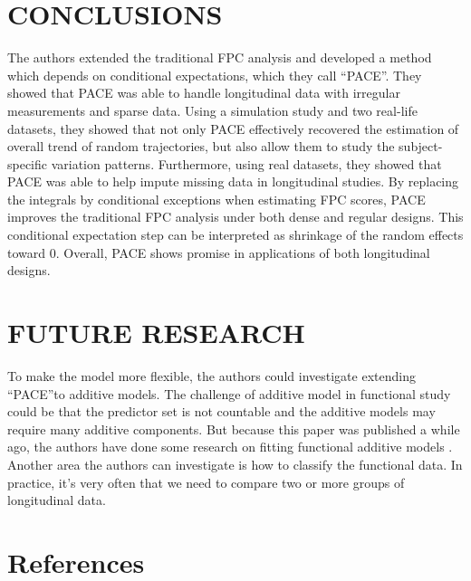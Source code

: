 \documentclass[11pt]{report}
\begin{document}
\section{CONCLUSIONS}
The authors extended the traditional FPC analysis and developed a method which depends on conditional expectations, which they call ``PACE''.
They showed that PACE was able to handle longitudinal data with irregular measurements and sparse data. 
Using a simulation study and two real-life datasets, they showed that not only PACE effectively recovered the estimation of overall trend of random trajectories, but also allow them to study the subject-specific variation patterns. 
Furthermore, using real datasets, they showed that PACE was able to help impute missing data in longitudinal studies. 
By replacing the integrals by conditional exceptions when estimating FPC scores, PACE improves the traditional FPC analysis under both dense and regular designs. 
This conditional expectation step can be interpreted as shrinkage of the random effects toward 0.  
Overall, PACE shows promise in applications of both longitudinal designs. 


\section{FUTURE RESEARCH}
To make the model more flexible, the authors could investigate extending ``PACE''to additive models. 
The challenge of additive model in functional study could be that the predictor set is not countable and the additive models may require many additive components. 
But because this paper was published a while ago, the authors have done some research on fitting functional additive models \cite{Muller2008}. 
Another area the authors can investigate is how to classify the functional data. 
In practice, it's very often that we need to compare two or more groups of longitudinal data. 


\newpage
\section*{References}
\printbibliography    
\end{document}
